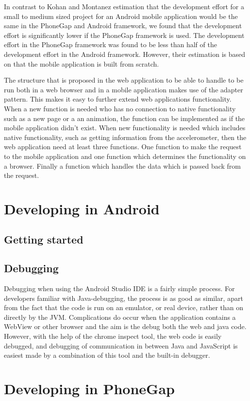 In contrast to Kohan and Montanez estimation that the development effort for a small to medium sized project for an Android mobile application would be the same in the PhoneGap and Android framework, we found that the development effort is significantly lower if the PhoneGap framework is used. The development effort in the PhoneGap framework was found to be less than half of the development effort in the Android framework. However, their estimation is based on that the mobile application is built from scratch. 

The structure that is proposed in the web application to be able to handle to be run both in a web browser and in a mobile application makes use of the adapter pattern. This makes it easy to further extend web applications functionality. When a new function is needed who has no connection to native functionality such as a new page or a an animation, the function can be implemented as if the mobile application didn’t exist. When new functionality is needed which includes native functionality, such as getting information from the accelerometer, then the web application need at least three functions. One function to make the request to the mobile application and one function which determines the functionality on a browser. Finally a function which handles the data which is passed back from the request. 

\iffalse
\section{Developing in Android}
\subsection{Getting started}
\subsection{Debugging}
Debugging when using the Android Studio IDE is a fairly simple process. For developers familiar with Java-debugging, the process is as good as similar, apart from the fact that the code is run on an emulator, or real device, rather than on directly by the JVM. Complications do occur when the application contains a WebView or other browser and the aim is the debug both the web and java code. However, with the help of the chrome inspect tool, the web code is easily debugged, and debugging of communication in between Java and JavaScript is easiest made by a combination of this tool and the built-in debugger. 
\section{Developing in PhoneGap}
